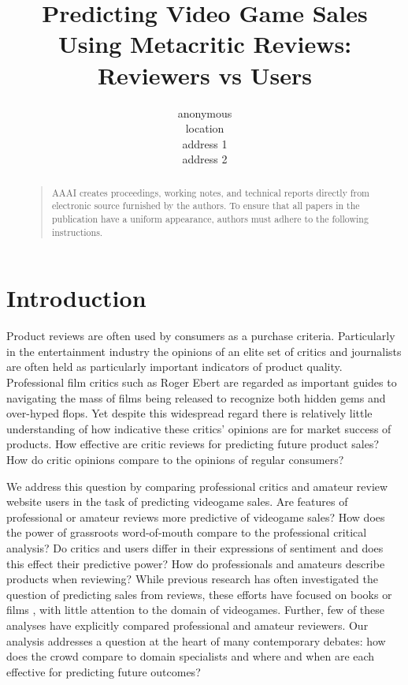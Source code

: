 \documentclass[letterpaper]{article}
\begin{document}
%
\title{Predicting Video Game Sales Using Metacritic Reviews:\\Reviewers vs Users}
\author{anonymous\\
location\\
address 1\\
address 2\\
}
\maketitle

\begin{abstract}
\begin{quote}
AAAI creates proceedings, working notes, and technical reports directly from electronic source furnished by the authors. To ensure that all papers in the publication have a uniform appearance, authors must adhere to the following instructions. 
\end{quote}
\end{abstract}

\section{Introduction}
Product reviews are often used by consumers as a purchase criteria. Particularly in the entertainment industry the opinions of an elite set of critics and journalists are often held as particularly important indicators of product quality. Professional film critics such as Roger Ebert are regarded as important guides to navigating the mass of films being released to recognize both hidden gems and over-hyped flops. Yet despite this widespread regard there is relatively little understanding of how indicative these critics' opinions are for market success of products. How effective are critic reviews for predicting future product sales? How do critic opinions compare to the opinions of regular consumers?

We address this question by comparing professional critics and amateur review website users in the task of predicting videogame sales. Are features of professional or amateur reviews more predictive of videogame sales? How does the power of grassroots word-of-mouth compare to the professional critical analysis? Do critics and users differ in their expressions of sentiment and does this effect their predictive power? How do professionals and amateurs describe products when reviewing? While previous research has often investigated the question of predicting sales from reviews, these efforts have focused on books \cite{gruhl2005predictive} or films \cite{dellarocas2007exploring} \cite{yu2012mining} \cite{duan2008online} \cite{liu2001word}, with little attention to the domain of videogames. Further, few of these analyses have explicitly compared professional and amateur reviewers. Our analysis addresses a question at the heart of many contemporary debates: how does the crowd compare to domain specialists and where and when are each effective for predicting future outcomes?
\end{document}
